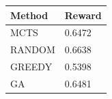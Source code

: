 \begin{tabular}{ll}
\hline
Method & Reward \\
\hline
  MCTS & 0.6472 \\
  RANDOM & 0.6638 \\
  GREEDY & 0.5398 \\
  GA & 0.6481 \\
\hline
\end{tabular}
